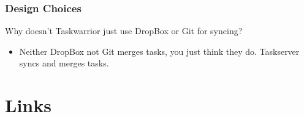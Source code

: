 \documentclass[t,handout]{beamer}
\begin{document}

\begin{frame}[fragile]\frametitle{Design Choices}

    Why doesn't Taskwarrior just use DropBox or Git for syncing?
    \begin{itemize}
        \item Neither DropBox not Git merges tasks, you just think they do. Taskserver syncs and merges tasks.
    \end{itemize}
\end{frame}

\section{Links}
\end{document}
